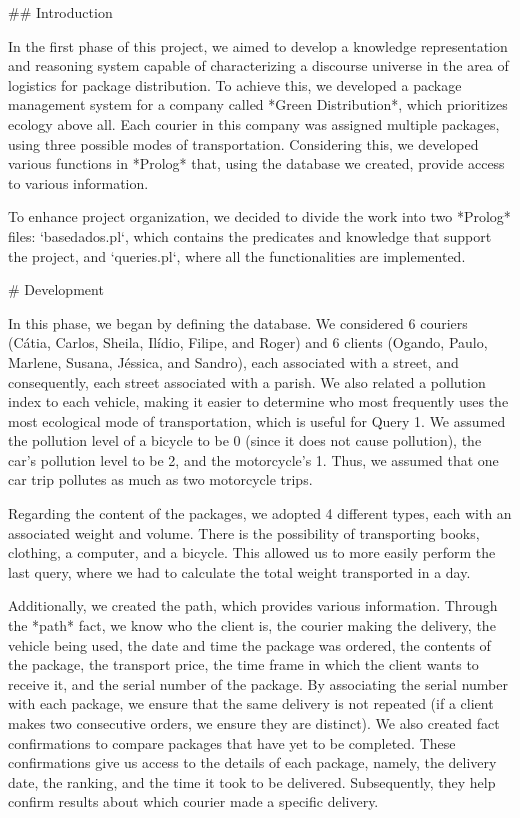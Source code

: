 ## Introduction

In the first phase of this project, we aimed to develop a knowledge representation and reasoning system capable of characterizing a discourse universe in the area of logistics for package distribution. To achieve this, we developed a package management system for a company called *Green Distribution*, which prioritizes ecology above all. Each courier in this company was assigned multiple packages, using three possible modes of transportation. Considering this, we developed various functions in *Prolog* that, using the database we created, provide access to various information.

To enhance project organization, we decided to divide the work into two *Prolog* files: `basedados.pl`, which contains the predicates and knowledge that support the project, and `queries.pl`, where all the functionalities are implemented.


# Development

In this phase, we began by defining the database. We considered 6 couriers (Cátia, Carlos, Sheila, Ilídio, Filipe, and Roger) and 6 clients (Ogando, Paulo, Marlene, Susana, Jéssica, and Sandro), each associated with a street, and consequently, each street associated with a parish. We also related a pollution index to each vehicle, making it easier to determine who most frequently uses the most ecological mode of transportation, which is useful for Query 1. We assumed the pollution level of a bicycle to be 0 (since it does not cause pollution), the car's pollution level to be 2, and the motorcycle's 1. Thus, we assumed that one car trip pollutes as much as two motorcycle trips.

Regarding the content of the packages, we adopted 4 different types, each with an associated weight and volume. There is the possibility of transporting books, clothing, a computer, and a bicycle. This allowed us to more easily perform the last query, where we had to calculate the total weight transported in a day.

Additionally, we created the path, which provides various information. Through the *path* fact, we know who the client is, the courier making the delivery, the vehicle being used, the date and time the package was ordered, the contents of the package, the transport price, the time frame in which the client wants to receive it, and the serial number of the package. By associating the serial number with each package, we ensure that the same delivery is not repeated (if a client makes two consecutive orders, we ensure they are distinct). We also created fact confirmations to compare packages that have yet to be completed. These confirmations give us access to the details of each package, namely, the delivery date, the ranking, and the time it took to be delivered. Subsequently, they help confirm results about which courier made a specific delivery.

